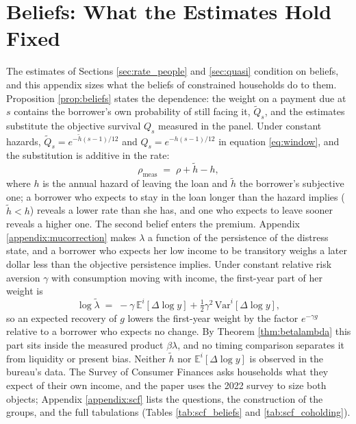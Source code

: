 \section{Beliefs: What the Estimates Hold Fixed}\label{appendix:beliefs}

The estimates of Sections \ref{sec:rate_people} and \ref{sec:quasi} condition on beliefs, and this appendix sizes what the beliefs of constrained households do to them. Proposition \ref{prop:beliefs} states the dependence: the weight on a payment due at $s$ contains the borrower's own probability of still facing it, $\tilde Q_s$, and the estimates substitute the objective survival $Q_s$ measured in the panel. Under constant hazards, $\tilde Q_s = e^{-\tilde h (s-1)/12}$ and $Q_s = e^{-h(s-1)/12}$ in equation \eqref{eq:window}, and the substitution is additive in the rate:
\begin{equation}\label{eq:beliefrate}
\rho_{\text{meas}} \;=\; \rho + \tilde h - h ,
\end{equation}
where $h$ is the annual hazard of leaving the loan and $\tilde h$ the borrower's subjective one; a borrower who expects to stay in the loan longer than the hazard implies ($\tilde h < h$) reveals a lower rate than she has, and one who expects to leave sooner reveals a higher one. The second belief enters the premium. Appendix \ref{appendix:mucorrection} makes $\lambda$ a function of the persistence of the distress state, and a borrower who expects her low income to be transitory weighs a later dollar less than the objective persistence implies. Under constant relative risk aversion $\gamma$ with consumption moving with income, the first-year part of her weight is
\begin{equation}\label{eq:beliefpremium}
\log \tilde\lambda \;=\; -\gamma\, \mathbb{E}^{i}[\Delta \log y] + \tfrac{1}{2}\gamma^{2}\, \mathrm{Var}^{i}[\Delta \log y] ,
\end{equation}
so an expected recovery of $g$ lowers the first-year weight by the factor $e^{-\gamma g}$ relative to a borrower who expects no change. By Theorem \ref{thm:betalambda} this part sits inside the measured product $\beta\lambda$, and no timing comparison separates it from liquidity or present bias. Neither $\tilde h$ nor $\mathbb{E}^{i}[\Delta \log y]$ is observed in the bureau's data. The Survey of Consumer Finances asks households what they expect of their own income, and the paper uses the 2022 survey to size both objects; Appendix \ref{appendix:scf} lists the questions, the construction of the groups, and the full tabulations (Tables \ref{tab:scf_beliefs} and \ref{tab:scf_coholding}).

